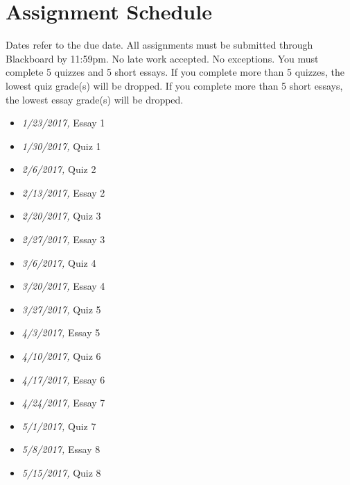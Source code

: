 \documentclass[article,oneside]{memoir}
\begin{document}
\section{ Assignment Schedule}
Dates refer to the due date. All assignments must be submitted through Blackboard by 11:59pm. No late work accepted. No exceptions. You must complete 5 quizzes and 5 short essays. If you complete more than 5 quizzes, the lowest quiz grade(s) will be dropped. If you complete more than 5 short essays, the lowest essay grade(s) will be dropped. 
\begin{itemize}
\item \textit{1/23/2017,} Essay 1
\item \textit{1/30/2017,} Quiz 1
\item \textit{2/6/2017,} Quiz 2
\item \textit{2/13/2017,} Essay 2
\item \textit{2/20/2017,} Quiz 3
\item \textit{2/27/2017,} Essay 3
\item \textit{3/6/2017,}  Quiz 4
\item \textit{3/20/2017,} Essay 4
\item \textit{3/27/2017,} Quiz 5
\item \textit{4/3/2017,} Essay 5
\item \textit{4/10/2017,} Quiz 6
\item \textit{4/17/2017,} Essay 6
\item \textit{4/24/2017,} Essay 7
\item \textit{5/1/2017,} Quiz 7
\item \textit{5/8/2017,} Essay 8
\item \textit{5/15/2017,} Quiz  8
\end{itemize}




\end{document}
